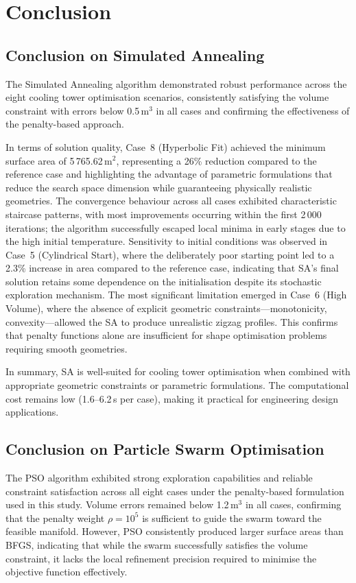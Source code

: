 \section{Conclusion}

\subsection{Conclusion on Simulated Annealing}

The Simulated Annealing algorithm demonstrated robust performance across the eight cooling tower optimisation scenarios, consistently satisfying the volume constraint with errors below 0.5\,m$^3$ in all cases and confirming the effectiveness of the penalty-based approach.

In terms of solution quality, Case~8 (Hyperbolic Fit) achieved the minimum surface area of 5\,765.62\,m$^2$, representing a 26\% reduction compared to the reference case and highlighting the advantage of parametric formulations that reduce the search space dimension while guaranteeing physically realistic geometries. The convergence behaviour across all cases exhibited characteristic staircase patterns, with most improvements occurring within the first 2\,000 iterations; the algorithm successfully escaped local minima in early stages due to the high initial temperature. Sensitivity to initial conditions was observed in Case~5 (Cylindrical Start), where the deliberately poor starting point led to a 2.3\% increase in area compared to the reference case, indicating that SA's final solution retains some dependence on the initialisation despite its stochastic exploration mechanism. The most significant limitation emerged in Case~6 (High Volume), where the absence of explicit geometric constraints---monotonicity, convexity---allowed the SA to produce unrealistic zigzag profiles. This confirms that penalty functions alone are insufficient for shape optimisation problems requiring smooth geometries.

In summary, SA is well-suited for cooling tower optimisation when combined with appropriate geometric constraints or parametric formulations. The computational cost remains low (1.6--6.2\,s per case), making it practical for engineering design applications.

\subsection{Conclusion on Particle Swarm Optimisation}

The PSO algorithm exhibited strong exploration capabilities and reliable constraint satisfaction across all eight cases under the penalty-based formulation used in this study. Volume errors remained below 1.2\,m$^3$ in all cases, confirming that the penalty weight $\rho = 10^5$ is sufficient to guide the swarm toward the feasible manifold. However, PSO consistently produced larger surface areas than BFGS, indicating that while the swarm successfully satisfies the volume constraint, it lacks the local refinement precision required to minimise the objective function effectively.

